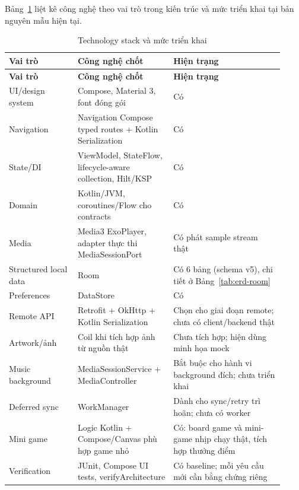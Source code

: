 Bảng~\ref{tab:tech-stack} liệt kê công nghệ theo vai trò trong kiến trúc và mức triển khai tại bản nguyên mẫu hiện tại.

\begingroup
\small
\renewcommand{\arraystretch}{1.2}
\setlength{\tabcolsep}{3pt}
\begin{longtable}{>{\RaggedRight\arraybackslash}p{0.23\linewidth}>{\RaggedRight\arraybackslash}p{0.32\linewidth}>{\RaggedRight\arraybackslash}p{0.37\linewidth}}
\caption{Technology stack và mức triển khai}
\label{tab:tech-stack}\\
\toprule
\textbf{Vai trò} & \textbf{Công nghệ chốt} & \textbf{Hiện trạng} \\
\midrule
\endfirsthead
\toprule
\textbf{Vai trò} & \textbf{Công nghệ chốt} & \textbf{Hiện trạng} \\
\midrule
\endhead
\bottomrule
\endfoot
UI/design system & Compose, Material 3, font đóng gói & Có \\
Navigation & Navigation Compose typed routes + Kotlin Serialization & Có \\
State/DI & ViewModel, StateFlow, lifecycle-aware collection, Hilt/KSP & Có \\
Domain & Kotlin/JVM, coroutines/Flow cho contracts & Có \\
Media & Media3 ExoPlayer, adapter thực thi MediaSessionPort & Có phát sample stream thật \\
Structured local data & Room & Có 6 bảng (schema v5), chi tiết ở Bảng~\ref{tab:erd-room} \\
Preferences & DataStore & Có \\
Remote API & Retrofit + OkHttp + Kotlin Serialization & Chọn cho giai đoạn remote; chưa có client/backend thật \\
Artwork/ảnh & Coil khi tích hợp ảnh từ nguồn thật & Chưa tích hợp; hiện dùng minh họa mock \\
Music background & MediaSessionService + MediaController & Bắt buộc cho hành vi background đích; chưa triển khai \\
Deferred sync & WorkManager & Dành cho sync/retry trì hoãn; chưa có worker \\
Mini game & Logic Kotlin + Compose/Canvas phù hợp game nhỏ & Có: board game và mini-game nhịp chạy thật, tích hợp thưởng điểm \\
Verification & JUnit, Compose UI tests, verifyArchitecture & Có baseline; mỗi yêu cầu mới cần bằng chứng riêng \\
\end{longtable}
\endgroup

